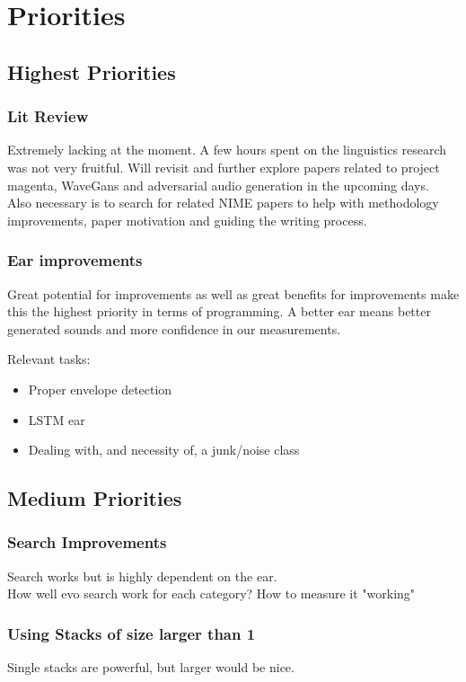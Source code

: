 \documentclass{article}
\begin{document}
\section{Priorities}
\subsection{Highest Priorities}
\subsubsection{Lit Review}
Extremely lacking at the moment. A few hours spent on the linguistics research was not very fruitful. Will revisit and further explore papers related to project magenta, WaveGans and adversarial audio generation in the upcoming days. \\
Also necessary is to search for related NIME papers to help with methodology improvements, paper motivation and guiding the writing process.  
\subsubsection{Ear improvements}
Great potential for improvements as well as great benefits for improvements make this the highest priority in terms of programming. A better ear means better generated sounds and more confidence in our measurements.

Relevant tasks:
\begin{itemize}
    \item Proper envelope detection
    \item LSTM ear
    \item Dealing with, and necessity of, a junk/noise class
\end{itemize}
\subsection{Medium Priorities}
\subsubsection{Search Improvements}
Search works but is highly dependent on the ear.\\ 
How well evo search work for each category? How to measure it "working"
\subsubsection{Using Stacks of size larger than 1}
Single stacks are powerful, but larger would be nice. 
\end{document}
